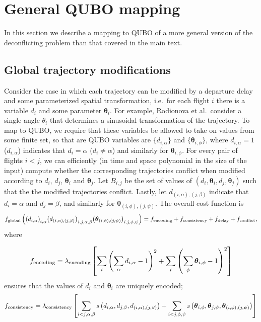 \section{General QUBO mapping}
In this section we describe a mapping to QUBO of a more general version of the deconflicting problem than that covered in the main text.

\subsection{Global trajectory modifications}
Consider the case in which each trajectory can be modified by a departure delay and some parameterized spatial transformation, i.e.\ for each flight $i$ there is a variable $d_i$ and some parameter $\boldsymbol \theta_i$.
For example, Rodionova et al.\ consider a single angle $\theta_i$ that determines a sinusoidal transformation of the trajectory.
To map to QUBO, we require that these variables be allowed to take on values from some finite set, so that are QUBO variables are $\{d_{i, \alpha}\}$ and $\{\boldsymbol \theta_{i,\phi}\}$, where $d_{i, \alpha} = 1$ ($d_{i, \alpha}$) indicates that $d_i = \alpha$ ($d_i \neq \alpha$) and similarly for $\boldsymbol \theta_{i, \phi}$.
For every pair of flights $i < j$, we can efficiently (in time and space polynomial in the size of the input) compute whether the corresponding trajectories conflict when modified according to $d_i$, $d_j$, $\boldsymbol \theta_i$ and $\boldsymbol \theta_j$.
Let $B_{i, j}$ be the set of values of $(d_i, \boldsymbol \theta_i, d_j, \boldsymbol \theta_j)$ such that the the modified trajectories conflict.
Lastly, let $d_{(i, \alpha), (j, \beta)}$ indicate that $d_i = \alpha$ and $ d_j = \beta$, and similarly for $\boldsymbol \theta_{(i, \phi), (j, \psi)}$.
The overall cost function is
\begin{equation}
f_{\mathrm{global}}
\left(
{\left(d_{i,\alpha}\right)}_{i,\alpha}
{\left(d_{(i,\alpha),(j,\beta)}\right)}_{i,j,\alpha,\beta}
{\left(\boldsymbol \theta_{(i,\phi),(j,\psi)}\right)}_{i,j,\phi,\psi}
\right)
=
f_{\mathrm{encoding}} +
f_{\mathrm{consistency}} +
f_{\mathrm{delay}} +
f_{\mathrm{conflict}},
\end{equation}
where 
\begin{widetext}
\begin{equation}
  f_{\mathrm{encoding}}
  =
  \lambda_{\mathrm{encoding}}
  \left[
  \sum_{i} {\left(\sum_{\alpha} d_{i, \alpha} -1\right)}^2
  +
  \sum_{i} {\left(\sum_{\phi} \boldsymbol \theta_{i, \phi} -1\right)}^2
\right]
\end{equation}
ensures that the values of $d_i$ and $\boldsymbol \theta_i$ are uniquely encoded;
\begin{equation}
f_{\mathrm{consistency}}
=
\lambda_{\mathrm{consistency}}
\left[
\sum_{i < j,\alpha, \beta} 
s\left(d_{i,\alpha}, d_{j, \beta}, d_{(i, \alpha), (j, \beta)}\right)
+
\sum_{i < j,\phi, \psi} 
s\left(\boldsymbol \theta_{i,\phi}, \boldsymbol \theta_{j, \psi}, \boldsymbol \theta_{(i, \phi), (j, \psi)}\right)
\right]
\end{equation}
\end{widetext}
